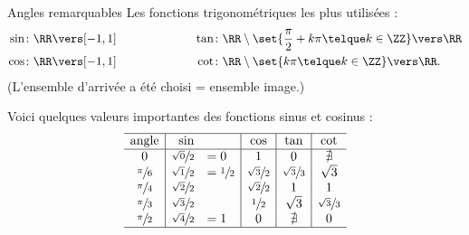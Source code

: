 \begin{frame}{Angles remarquables}
  Les fonctions trigonométriques les plus utilisées :
  \begin{align*}
  \sin &\colon \RR \vers [-1,1]\hspace*{2cm}&  \tan &\colon
  \RR\setminus\set{\frac\pi2 + k\pi \telque k \in \ZZ} \vers \RR \\ 
  \cos &\colon \RR \vers [-1,1]& \cot &\colon
  \RR\setminus\set{k\pi \telque k \in \ZZ} \vers \RR.
\end{align*}
(L'ensemble d'arrivée a été choisi = ensemble image.)\pause

Voici quelques valeurs importantes des fonctions sinus et cosinus :
\begin{equation}\label{valeurscossin}
  \begin{array}{c|rl|c|c|c}
    \hline 
    \text{angle} & \sin & & \cos & \tan & \cot\\
    \hline
    0          &\sfrac {\sqrt 0}{2}& = 0& 1 & 0 & \nexists\\
    \sfrac \pi 6&\sfrac {\sqrt 1}{2}& = \sfrac12 &\sfrac {\sqrt 3}{2} &\sfrac {\sqrt 3}{3}& \sqrt 3\\
    \sfrac \pi 4&\sfrac {\sqrt 2}{2}& & \sfrac {\sqrt 2}{2} & 1 &1\\  
    \sfrac \pi 3&\sfrac {\sqrt 3}{2}& & \sfrac 1 2 &\sqrt 3 & \sfrac {\sqrt 3}{3}\\ 
    \sfrac \pi 2&\sfrac {\sqrt 4}{2}& = 1&0&\nexists&0\\
    \hline
  \end{array} 
\end{equation}
\end{frame}

